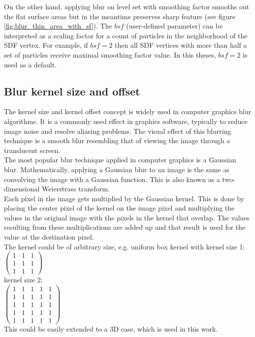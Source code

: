 On the other hand, applying blur on level set with smoothing factor smooths out the flat surface areas but in the meantime preserves sharp feature (see figure \ref{fig:blur_thin_area_with_sf}). The $bsf$ (user-defined parameter) can be interpreted as a scaling factor for a count of particles in the neighborhood of the SDF vertex. For example, if $bsf=2$ then all SDF vertices with more than half a set of particles receive maximal smoothing factor value. In this theses, $bsf=2$ is used as a default.
\subsection{Blur kernel size and offset}
The kernel size and kernel offset concept is widely used in computer graphics blur algorithms. It is a commonly used effect in graphics software, typically to reduce image noise and resolve aliasing problems. The visual effect of this blurring technique is a smooth blur resembling that of viewing the image through a translucent screen.\\
The most popular blur technique applied in computer graphics is a Gaussian blur. Mathematically, applying a Gaussian blur to an image is the same as convolving the image with a Gaussian function. This is also known as a two-dimensional Weierstrass transform.\\
Each pixel in the image gets multiplied by the Gaussian kernel. This is done by placing the center pixel of the kernel on the image pixel and multiplying the values in the original image with the pixels in the kernel that overlap. The values resulting from these multiplications are added up and that result is used for the value at the destination pixel.\\
The kernel could be of arbitrary size, e.g. uniform box kernel with kernel size 1:\\
$\begin{pmatrix}
1 & 1 & 1\\
1 & 1 & 1\\
1 & 1 & 1
\end{pmatrix}$\\kernel size 2:\\
$\begin{pmatrix}
1 & 1 & 1 & 1 & 1\\
1 & 1 & 1 & 1 & 1\\
1 & 1 & 1 & 1 & 1\\
1 & 1 & 1 & 1 & 1\\
1 & 1 & 1 & 1 & 1
\end{pmatrix}$\\ This could be easily extended to a 3D case, which is used in this work.\\
